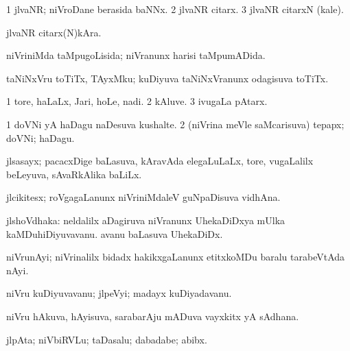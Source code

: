 {\bentry
{} 
\gl{\nA}
\expl{}
\bmng
\bnum
\num{1} jlvaNR; niVroDane berasida baNNx. 
\num{2} jlvaNR citarx. 
\num{3} jlvaNR citarxN (kale). 
\enum
\emng
\eentry

\bentry
{} 
\gl{\nA}
\expl{}
\bmng
jlvaNR citarx(N)kAra. 
\emng
\eentry

\bentry
{} 
\gl{\gu}
\expl{}
\bmng
niVriniMda taMpugoLisida; niVranunx harisi taMpumADida. 
\emng
\eentry

\bentry
{} 
\gl{\nA}
\expl{}
\bmng
taNiNxVru toTiTx, TAyxMku; kuDiyuva taNiNxVranunx odagisuva toTiTx. 
\emng
\eentry

\bentry
{} 
\gl{\nA}
\expl{}
\bmng
\bnum
\num{1} tore, haLaLx, Jari, hoLe, nadi. 
\num{2} kAluve. 
\num{3} ivugaLa pAtarx. 
\enum
\emng
\eentry

\bentry
{} 
\gl{\nA}
\expl{}
\bmng
\bnum
\num{1} doVNi yA haDagu naDesuva kushalte. 
\num{2} (niVrina meVle saMcarisuva) tepapx; doVNi; haDagu. 
\enum
\emng
\eentry

\bentry
{} 
\gl{\nA}
\expl{}
\bmng
jlsasayx; pacacxDige baLasuva, kAravAda elegaLuLaLx, tore, \mo vugaLalilx beLeyuva, sAvaRkAlika baLiLx. 
\emng
\eentry

\bentry
{} 
\gl{\nA}
\expl{}
\bmng
jlcikitesx; roVgagaLanunx niVriniMdaleV guNpaDisuva vidhAna. 
\emng
\eentry

\bentry
{} 
\gl{\nA}
\expl{}
\bmng
jlshoVdhaka: 
\banum
{} neldalilx aDagiruva niVranunx UhekaDiDxya mUlka kaMDuhiDiyuvavanu. 
 avanu baLasuva UhekaDiDx. 
\eanum
\emng
\eentry

\bentry
{} 
\gl{\nA}
\expl{}
\bmng
niVrunAyi; niVrinalilx bidadx hakikxgaLanunx etitxkoMDu baralu tarabeVtAda nAyi. 
\emng
\eentry

\bentry
{} 
\gl{\nA}
\expl{}
\bmng
niVru kuDiyuvavanu; jlpeVyi; madayx kuDiyadavanu. 
\emng
\eentry

\bentry
{} 
\gl{\nA}
\expl{}
\bmng
niVru hAkuva, hAyisuva, sarabarAju mADuva vayxkitx yA sAdhana. 
\emng
\eentry

\bentry
{} 
\gl{\nA}
\expl{}
\bmng
jlpAta; niVbiRVLu; taDasalu; dabadabe; abibx. 
\emng
\eentry

}
